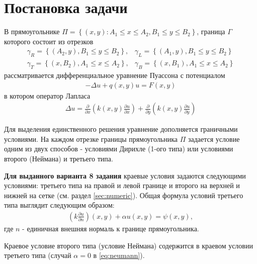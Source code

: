 \documentclass[12pt, fleqn]{article}
\theoremstyle{definition}
\begin{document}
\section{Постановка задачи}
В прямоугольнике $\Pi=\left\{(x, y): A_{1} \leqslant x \leqslant A_{2}, B_{1} \leqslant y \leqslant B_{2}\right\}$, граница $\Gamma$ которого состоит из отрезков
\abovedisplayskip=1pt
\belowdisplayskip=2pt
\noindent
$$
\begin{array}{ll}
\gamma_{R}=\left\{\left(A_{2}, y\right), B_{1} \leqslant y \leqslant B_{2}\right\}, & \gamma_{L}=\left\{\left(A_{1}, y\right), B_{1} \leqslant y \leqslant B_{2}\right\} \\
\gamma_{T}=\left\{\left(x, B_{2}\right), A_{1} \leqslant x \leqslant A_{2}\right\}, & \gamma_{B}=\left\{\left(x, B_{1}\right), A_{1} \leqslant x \leqslant A_{2}\right\}
\end{array}
$$
рассматривается дифференциальное уравнение Пуассона с потенциалом
\abovedisplayskip=1pt
\belowdisplayskip=2pt
\noindent
\begin{gather}
-\Delta u+q(x, y) u=F(x, y) \label{eq:poisson}
\end{gather}
в котором оператор Лапласа
\abovedisplayskip=1pt
\belowdisplayskip=2pt
\noindent
\begin{gather}
\Delta u=\frac{\partial}{\partial x}\left(k(x, y) \frac{\partial u}{\partial x}\right)+\frac{\partial}{\partial y}\left(k(x, y) \frac{\partial u}{\partial y}\right) \label{eq:laplace}
\end{gather}

Для выделения единственного решения уравнение дополняется граничными условиями. На каждом отрезке границы прямоугольника $\Pi$ задается условие одним из двух способов - условиями Дирихле (1-ого типа) или условиями второго (Неймана) и третьего типа. 

\textbf{Для выданного варианта 8 задания} краевые условия задаются следующими условиями: третьего типа на правой и левой границе и второго на верхней и нижней на сетке (см. раздел \ref{sec:numeric}). Общая формула условий третьего типа выглядит следующим образом:
\abovedisplayskip=1pt
\belowdisplayskip=2pt
\noindent
\begin{gather}
 \left(k \frac{\partial u}{\partial n}\right)(x, y)+\alpha u(x, y)=\psi(x, y),
 \label{eq:neumann}
\end{gather}
где $n$ - единичная внешняя нормаль к границе прямоугольника.

Краевое условие второго типа (условие Неймана) содержится в краевом условии третьего типа (случай $\alpha=0$ в \ref{eq:neumann}).
\end{document}
